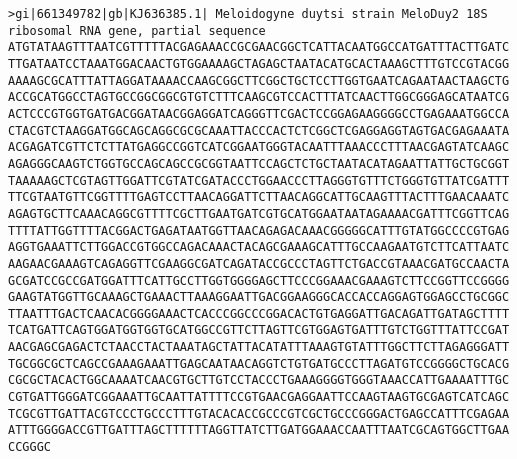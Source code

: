 \documentclass[11pt]{article}
\begin{document}
\begin{Verbatim}[commandchars=\\\{\}]
>gi|661349782|gb|KJ636385.1| Meloidogyne duytsi strain MeloDuy2 18S ribosomal RNA gene, partial sequence
ATGTATAAGTTTAATCGTTTTTACGAGAAACCGCGAACGGCTCATTACAATGGCCATGATTTACTTGATC
TTGATAATCCTAAATGGACAACTGTGGAAAAGCTAGAGCTAATACATGCACTAAAGCTTTGTCCGTACGG
AAAAGCGCATTTATTAGGATAAAACCAAGCGGCTTCGGCTGCTCCTTGGTGAATCAGAATAACTAAGCTG
ACCGCATGGCCTAGTGCCGGCGGCGTGTCTTTCAAGCGTCCACTTTATCAACTTGGCGGGAGCATAATCG
ACTCCCGTGGTGATGACGGATAACGGAGGATCAGGGTTCGACTCCGGAGAAGGGGCCTGAGAAATGGCCA
CTACGTCTAAGGATGGCAGCAGGCGCGCAAATTACCCACTCTCGGCTCGAGGAGGTAGTGACGAGAAATA
ACGAGATCGTTCTCTTATGAGGCCGGTCATCGGAATGGGTACAATTTAAACCCTTTAACGAGTATCAAGC
AGAGGGCAAGTCTGGTGCCAGCAGCCGCGGTAATTCCAGCTCTGCTAATACATAGAATTATTGCTGCGGT
TAAAAAGCTCGTAGTTGGATTCGTATCGATACCCTGGAACCCTTAGGGTGTTTCTGGGTGTTATCGATTT
TTCGTAATGTTCGGTTTTGAGTCCTTAACAGGATTCTTAACAGGCATTGCAAGTTTACTTTGAACAAATC
AGAGTGCTTCAAACAGGCGTTTTCGCTTGAATGATCGTGCATGGAATAATAGAAAACGATTTCGGTTCAG
TTTTATTGGTTTTACGGACTGAGATAATGGTTAACAGAGACAAACGGGGGCATTTGTATGGCCCCGTGAG
AGGTGAAATTCTTGGACCGTGGCCAGACAAACTACAGCGAAAGCATTTGCCAAGAATGTCTTCATTAATC
AAGAACGAAAGTCAGAGGTTCGAAGGCGATCAGATACCGCCCTAGTTCTGACCGTAAACGATGCCAACTA
GCGATCCGCCGATGGATTTCATTGCCTTGGTGGGGAGCTTCCCGGAAACGAAAGTCTTCCGGTTCCGGGG
GAAGTATGGTTGCAAAGCTGAAACTTAAAGGAATTGACGGAAGGGCACCACCAGGAGTGGAGCCTGCGGC
TTAATTTGACTCAACACGGGGAAACTCACCCGGCCCGGACACTGTGAGGATTGACAGATTGATAGCTTTT
TCATGATTCAGTGGATGGTGGTGCATGGCCGTTCTTAGTTCGTGGAGTGATTTGTCTGGTTTATTCCGAT
AACGAGCGAGACTCTAACCTACTAAATAGCTATTACATATTTAAAGTGTATTTGGCTTCTTAGAGGGATT
TGCGGCGCTCAGCCGAAAGAAATTGAGCAATAACAGGTCTGTGATGCCCTTAGATGTCCGGGGCTGCACG
CGCGCTACACTGGCAAAATCAACGTGCTTGTCCTACCCTGAAAGGGGTGGGTAAACCATTGAAAATTTGC
CGTGATTGGGATCGGAAATTGCAATTATTTTCCGTGAACGAGGAATTCCAAGTAAGTGCGAGTCATCAGC
TCGCGTTGATTACGTCCCTGCCCTTTGTACACACCGCCCGTCGCTGCCCGGGACTGAGCCATTTCGAGAA
ATTTGGGGACCGTTGATTTAGCTTTTTTAGGTTATCTTGATGGAAACCAATTTAATCGCAGTGGCTTGAA
CCGGGC


\end{Verbatim}
\end{document}
